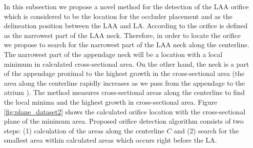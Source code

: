 \documentclass[review]{elsarticle}
\begin{document}
In this subsection we propose a novel method for the detection of the LAA
orifice which is considered to be the location for the occluder placement and
as the delineation position between the LAA and LA. According to
\cite{walker2012_Anatomicalanalysisleft} the orifice is defined as the
narrowest part of the LAA neck. Therefore, in order to locate the orifice we
propose to search for the narrowest part of the LAA neck along the centerline.
The narrowest part of the appendage neck will be a location with a local
minimum in calculated cross-sectional area. On the other hand, the neck is a
part of the appendage proximal to the highest growth in the cross-sectional
area (the area along the centerline rapidly increases as we pass from the
appendage to the atrium \cite{christiaens2010_Realthreedimensionalassessment}).
The method measures cross-sectional areas along the centerline to find the
local minima and the highest growth in cross-sectional area.  Figure
\ref{fig:plane_dataset2} shows the calculated orifice location with the
cross-sectional plane of the minimum area.  Proposed orifice detection
algorithm consists of two steps: (1) calculation of the areas  along the
centerline $C$  and (2) search for the smallest area within calculated areas
which occurs right before the LA.
\end{document}
